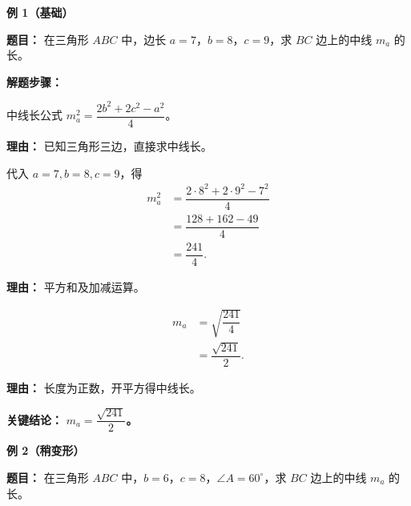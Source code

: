 \begin{examplebox}
	\textbf{\textcolor{CExample}{例 1（基础）}}

	\textbf{\textcolor{CExample}{题目：}}
	在三角形 $ABC$ 中，边长 $a=7$，$b=8$，$c=9$，求 $BC$ 边上的中线 $m_a$ 的长。

	\textbf{\textcolor{CExample}{解题步骤：}}
	\begin{description}[style=nextline, leftmargin=2.8em, labelsep=0.5em, itemsep=0.45em]
		\item[\textbf{第一步（套用公式）：}] 中线长公式 $m_a^2 = \dfrac{2b^2+2c^2-a^2}{4}$。
			\par\textbf{理由：} 已知三角形三边，直接求中线长。
		\item[\textbf{第二步（数值计算）：}] 代入 $a=7,b=8,c=9$，得
			\[
				\begin{aligned}
					m_a^2 &= \dfrac{2\cdot8^2+2\cdot9^2-7^2}{4} \\
					&= \dfrac{128+162-49}{4} \\
					&= \dfrac{241}{4}.
			\end{aligned}
			\]
			\par\textbf{理由：} 平方和及加减运算。
		\item[\textbf{第三步（开方取正）：}]
			\[
				\begin{aligned}
					m_a &= \sqrt{\dfrac{241}{4}} \\
					&= \dfrac{\sqrt{241}}{2}.
			\end{aligned}
			\]
			\par\textbf{理由：} 长度为正数，开平方得中线长。
	\end{description}

	\textbf{\textcolor{CExample}{关键结论：}}
	\textbf{$m_a = \dfrac{\sqrt{241}}{2}$。}

	\medskip
	\textbf{\textcolor{CExample}{例 2（稍变形）}}

	\textbf{\textcolor{CExample}{题目：}}
	在三角形 $ABC$ 中，$b=6$，$c=8$，$\angle A = 60^{\circ}$，求 $BC$ 边上的中线 $m_a$ 的长。


\end{examplebox}
